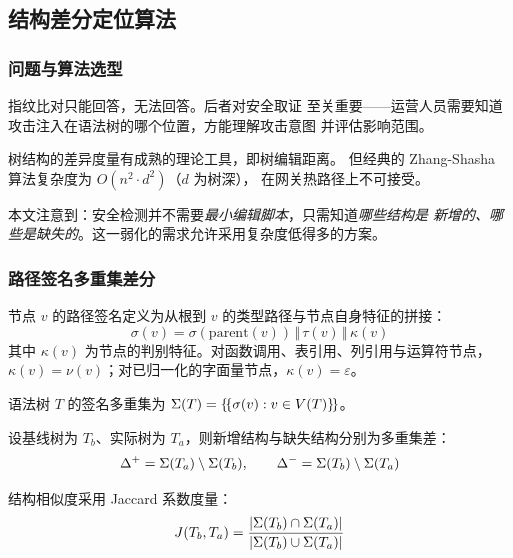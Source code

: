 \subsection{结构差分定位算法}
\label{subsec:diff}

\subsubsection{问题与算法选型}

指纹比对只能回答，无法回答。后者对安全取证
至关重要——运营人员需要知道攻击注入在语法树的哪个位置，方能理解攻击意图
并评估影响范围。

树结构的差异度量有成熟的理论工具，即树编辑距离\cite{zhang1989simple}。
但经典的 Zhang-Shasha 算法复杂度为 $O(n^2 \cdot d^2)$（$d$ 为树深），
在网关热路径上不可接受\cite{bille2005survey}。

本文注意到：安全检测并不需要\emph{最小编辑脚本}，只需知道\emph{哪些结构是
新增的、哪些是缺失的}。这一弱化的需求允许采用复杂度低得多的方案。

\subsubsection{路径签名多重集差分}

\begin{definition}[节点路径签名]
节点 $v$ 的路径签名定义为从根到 $v$ 的类型路径与节点自身特征的拼接：
\begin{equation}
\sigma(v) = \sigma(\text{parent}(v)) \,\Vert\, \tau(v) \,\Vert\, \kappa(v)
\end{equation}
其中 $\kappa(v)$ 为节点的判别特征。对函数调用、表引用、列引用与运算符节点，
$\kappa(v) = \nu(v)$；对已归一化的字面量节点，$\kappa(v) = \varepsilon$。
\end{definition}

\begin{definition}[签名多重集]
语法树 $T$ 的签名多重集为 $\Sigma(T) = \{\!\{\sigma(v) : v \in V(T)\}\!\}$。
\end{definition}

设基线树为 $T_b$、实际树为 $T_a$，则新增结构与缺失结构分别为多重集差：
\begin{equation}
\Delta^{+} = \Sigma(T_a) \setminus \Sigma(T_b), \qquad
\Delta^{-} = \Sigma(T_b) \setminus \Sigma(T_a)
\end{equation}

结构相似度采用 Jaccard 系数度量：
\begin{equation}
J(T_b, T_a) = \frac{|\Sigma(T_b) \cap \Sigma(T_a)|}{|\Sigma(T_b) \cup \Sigma(T_a)|}
\label{eq:jaccard}
\end{equation}

